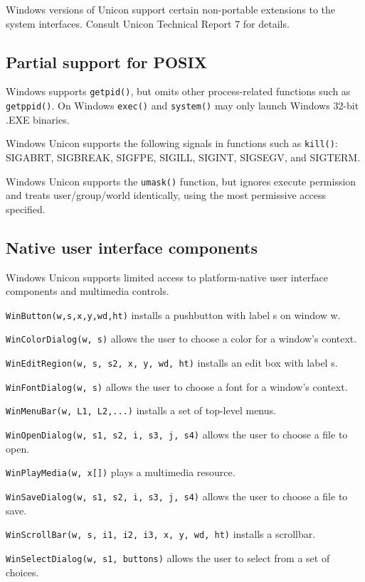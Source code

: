 Windows versions of Unicon support certain non-portable extensions to
the system interfaces. Consult Unicon Technical Report 7 for details.

\subsection*{Partial support for POSIX}

Windows supports \texttt{getpid()}, but omits other
process-related functions such as \texttt{getppid()}. On Windows
\texttt{exec()} and \texttt{system()} may only launch Windows 32-bit
.EXE binaries.

Windows Unicon supports the following signals in functions such as
\texttt{kill()}: SIGABRT, SIGBREAK, SIGFPE, SIGILL, SIGINT, SIGSEGV, and
SIGTERM.

Windows Unicon supports the \texttt{umask()} function, but ignores execute
permission and treats user/group/world identically, using the most
permissive access specified.

\subsection*{Native user interface components}

Windows Unicon supports limited access to platform-native user interface
components and multimedia controls.

\texttt{WinButton(w,s,x,y,wd,ht)} installs a pushbutton with label s on window w.

\texttt{WinColorDialog(w, s)} allows the user to choose a color for a
window's context.

\texttt{WinEditRegion(w, s, s2, x, y, wd, ht)} installs an edit box with label s.

\texttt{WinFontDialog(w, s)} allows the user to choose a font for a
window's context.

\texttt{WinMenuBar(w, L1, L2,...)} installs a set of top-level menus.

\texttt{WinOpenDialog(w, s1, s2, i, s3, j, s4)} allows the user to
 choose a file to open.

\texttt{WinPlayMedia(w, x[])} plays a multimedia resource.

\texttt{WinSaveDialog(w, s1, s2, i, s3, j, s4)} allows the user to
 choose a file to save.

\texttt{WinScrollBar(w, s, i1, i2, i3, x, y, wd, ht)} installs a scrollbar.

\texttt{WinSelectDialog(w, s1, buttons)} allows the user to select from a set of
choices.

